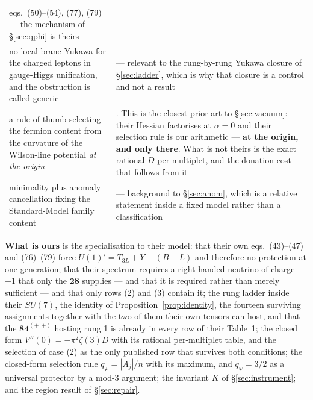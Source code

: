 \documentclass[11pt,a4paper]{article}
\newcommand{\su}[1]{SU(#1)}
\newcommand{\rep}[1]{\mathbf{#1}}
\begin{document}
\begin{longtable}{p{}p{}}
eqs.~(50)--(54), (77), (79) --- the mechanism of \S\ref{sec:qphi} is theirs\\
no local brane Yukawa for the charged leptons in gauge-Higgs unification, and the obstruction is
called generic & \cite{SSS,Maru19} --- relevant to the rung-by-rung Yukawa closure of
\S\ref{sec:ladder}, which is why that closure is a control and not a result\\
\rowcolor{amber!13}
a rule of thumb selecting the fermion content from the curvature of the Wilson-line potential
\emph{at the origin} & \cite{AdachiMaru}. This is the closest prior art to \S\ref{sec:vacuum}: their
Hessian factorises at $\alpha=0$ and their selection rule is our arithmetic --- \textbf{at the
origin, and only there}. What is not theirs is the exact rational $D$ per multiplet, and the
donation cost that follows from it\\
minimality plus anomaly cancellation fixing the Standard-Model family content &
\cite{GengMarshak} --- background to \S\ref{sec:anom}, which is a relative statement inside a fixed
model rather than a classification\\
\bottomrule
\end{longtable}
\endgroup

\textbf{What is ours} is the specialisation to their model: that their own eqs.~(43)--(47) and
(76)--(79) force $U(1)'=T_{3L}+Y-(B-L)$ and therefore no protection at one generation; that their
spectrum requires a right-handed neutrino of charge $-1$ that only the $\rep{28}$ supplies --- and
that it is required rather than merely sufficient --- and that only rows (2) and (3) contain it; the
rung ladder inside their $\su7$, the identity of Proposition~\ref{prop:identity}, the fourteen
surviving assignments together with the two of them their own tensors can host, and that the
$\rep{84}^{(+,+)}$ hosting rung 1 is already in every row of their Table~1; the closed form
$V''(0)=-\pi^2\zeta(3)D$ with its rational per-multiplet table, and the selection of case (2) as the
only published row that survives both conditions; the closed-form selection rule $q_\varphi=|A_j|/n$
with its maximum, and
$q_\varphi=3/2$ as a universal protector by a mod-3 argument; the invariant $K$ of
\S\ref{sec:instrument}; and the region result of \S\ref{sec:repair}.
\end{document}
